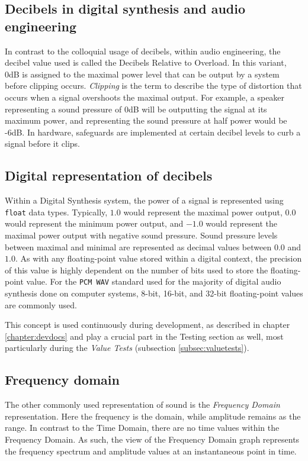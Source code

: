 \documentclass[a4paper,12pt]{report}
\begin{document}
\subsection{Decibels in digital synthesis and audio engineering}
\label{subsec:decibelindigitalsynthesis}
In contrast to the colloquial usage of decibels, within audio engineering, the decibel value used is called the Decibels Relative to Overload.  In this variant, 0dB is assigned to the maximal power level that can be output by a system before clipping occurs. \emph{Clipping} is the term to describe the type of distortion that occurs when a signal overshoots the maximal output. For example, a speaker representing a sound pressure of 0dB will be outputting the signal at its maximum power, and representing the sound pressure at half power would be -6dB. In hardware, safeguards are implemented at certain decibel levels to curb a signal before it clips.

\subsection{Digital representation of decibels}
\label{subsec:digitalrepdecibels}
Within a Digital Synthesis system, the power of a signal is represented using \texttt{float} data types. Typically, $1.0$ would represent the maximal power output, $0.0$ would represent the minimum power output, and $-1.0$ would represent the maximal power output with negative sound pressure. Sound pressure levels between maximal and minimal are represented as decimal values between $0.0$ and $1.0$. As with any floating-point value stored within a digital context, the precision of this value is highly dependent on the number of bits used to store the floating-point value. For the \texttt{PCM\ \-WAV} standard used for the majority of digital audio synthesis done on computer systems, 8-bit, 16-bit, and 32-bit floating-point values are commonly used.

This concept is used continuously during development, as described in chapter \ref{chapter:devdocs} and play a crucial part in the Testing section as well, most particularly during the \emph{Value Tests} (subsection \ref{subsec:valuetests}).

\subsection{Frequency domain}
\label{subsec:freqdomain}
The other commonly used representation of sound is the \emph{Frequency Domain} representation. Here the frequency is the domain, while amplitude remains as the range. In contrast to the Time Domain, there are no time values within the Frequency Domain. As such, the view of the Frequency Domain graph represents the frequency spectrum and amplitude values at an instantaneous point in time.
\end{document}
